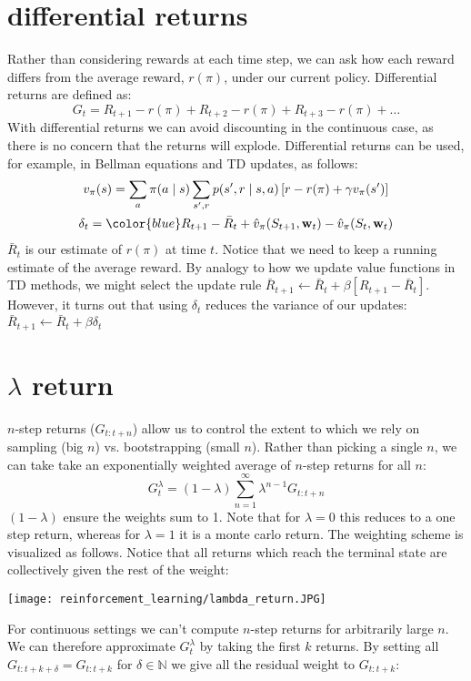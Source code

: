 \section{differential returns}
Rather than considering rewards at each time step, we can ask how each reward differs from the average reward, $r(\pi)$, under our current policy. Differential returns are defined as:
$$
G_t = R_{t+1} - r(\pi) + R_{t+2} - r(\pi) + R_{t+3} - r(\pi) + \dots
$$
With differential returns we can avoid discounting in the continuous case, as there is no concern that the returns will explode. Differential returns can be used, for example, in Bellman equations and TD updates, as follows:
\begin{gather*}
v_\pi(s) = \sum_a \pi(a \mid s) \sum_{s',r} p(s',r \mid s, a) \left[r - r(\pi) + \gamma v_\pi(s') \right] \\
\delta_t = {\color{blue} R_{t+1} - \bar{R}_t + \hat{v}_\pi(S_{t+1}, \mathbf{w}_t)} - \hat{v}_\pi(S_t, \mathbf{w}_t)
\end{gather*}
$\bar{R}_t$ is our estimate of $r(\pi)$ at time $t$. Notice that we need to keep a running estimate of the average reward. By analogy to how we update value functions in TD methods, we might select the update rule $\bar{R}_{t+1} \leftarrow \bar{R}_t + \beta [R_{t+1} - \bar{R}_t]$. However, it turns out that using $\delta_t$ reduces the variance of our updates: $\bar{R}_{t+1} \leftarrow \bar{R}_t + \beta \delta_t$

\section{$\lambda$ return}
$n$-step returns ($G_{t:t+n}$) allow us to control the extent to which we rely on sampling (big $n$) vs. bootstrapping (small $n$). Rather than picking a single $n$, we can take take an exponentially weighted average of $n$-step returns for all $n$:
$$ G_t^\lambda = (1-\lambda) \sum_{n=1}^\infty \lambda^{n-1}G_{t:t+n} $$
$(1-\lambda)$ ensure the weights sum to 1. Note that for $\lambda=0$ this reduces to a one step return, whereas for $\lambda=1$ it is a monte carlo return. The weighting scheme is visualized as follows. Notice that all returns which reach the terminal state are collectively given the rest of the weight:

\begin{center}\texttt{[image: reinforcement\_learning/lambda\_return.JPG]}\end{center}

For continuous settings we can't compute $n$-step returns for arbitrarily large $n$. We can therefore approximate $G_t^\lambda$ by taking the first $k$ returns. By setting all $G_{t:t+k+\delta} =G_{t:t+k} $ for $\delta \in \mathbb{N}$ we give all the residual weight to $G_{t:t+k}$:

